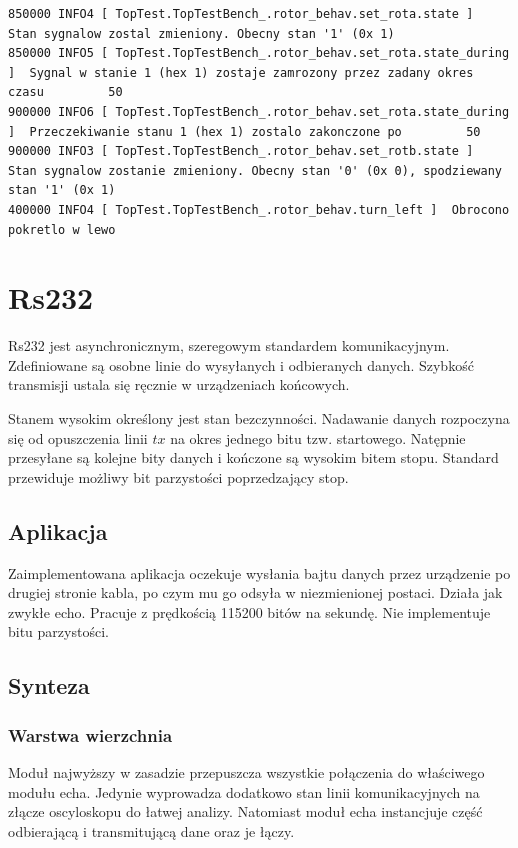 \documentclass[a4paper,12pt]{article}
\begin{document}
\begin{lstlisting}
850000 INFO4 [ TopTest.TopTestBench_.rotor_behav.set_rota.state ]  Stan sygnalow zostal zmieniony. Obecny stan '1' (0x 1)
850000 INFO5 [ TopTest.TopTestBench_.rotor_behav.set_rota.state_during ]  Sygnal w stanie 1 (hex 1) zostaje zamrozony przez zadany okres czasu         50
900000 INFO6 [ TopTest.TopTestBench_.rotor_behav.set_rota.state_during ]  Przeczekiwanie stanu 1 (hex 1) zostalo zakonczone po         50
900000 INFO3 [ TopTest.TopTestBench_.rotor_behav.set_rotb.state ]  Stan sygnalow zostanie zmieniony. Obecny stan '0' (0x 0), spodziewany stan '1' (0x 1)
400000 INFO4 [ TopTest.TopTestBench_.rotor_behav.turn_left ]  Obrocono pokretlo w lewo
\end{lstlisting}


\newpage
\section{Rs232}

Rs232 jest asynchronicznym, szeregowym standardem komunikacyjnym. Zdefiniowane są osobne linie do wysyłanych i odbieranych danych. Szybkość transmisji ustala się ręcznie w urządzeniach końcowych.

Stanem wysokim określony jest stan bezczynności. Nadawanie danych rozpoczyna się od opuszczenia linii $tx$ na okres jednego bitu tzw. startowego. Natępnie przesyłane są kolejne bity danych i kończone są wysokim bitem stopu. Standard przewiduje możliwy bit parzystości poprzedzający stop.

\subsection{Aplikacja}
Zaimplementowana aplikacja oczekuje wysłania bajtu danych przez urządzenie po drugiej stronie kabla, po czym mu go odsyła w niezmienionej postaci. Działa jak zwykłe echo. Pracuje z prędkością 115200 bitów na sekundę. Nie implementuje bitu parzystości.

\subsection{Synteza}

\subsubsection{Warstwa wierzchnia}
Moduł najwyższy w zasadzie przepuszcza wszystkie połączenia do właściwego modułu echa. Jedynie wyprowadza dodatkowo stan linii komunikacyjnych na złącze oscyloskopu do łatwej analizy. Natomiast moduł echa instancjuje część odbierającą i transmitującą dane oraz je łączy.

\end{document}
